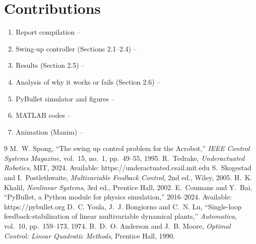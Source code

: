 \documentclass[12pt,a4paper]{article}
\begin{document}
\section{Contributions}
\begin{enumerate}
\item Report compilation -- \underline{\hspace{4cm}}
\item Swing-up controller (Sections 2.1--2.4) -- \underline{\hspace{4cm}}
\item Results (Section 2.5) -- \underline{\hspace{4cm}}
\item Analysis of why it works or fails (Section 2.6) -- \underline{\hspace{4cm}}
\item PyBullet simulator and figures -- \underline{\hspace{4cm}}
\item MATLAB codes -- \underline{\hspace{4cm}}
\item Animation (Manim) -- \underline{\hspace{4cm}}
\end{enumerate}

\begin{thebibliography}{9}
 M.~W. Spong, ``The swing up control problem for the Acrobot,'' \emph{IEEE Control Systems Magazine}, vol.~15, no.~1, pp.~49--55, 1995.
 R.~Tedrake, \emph{Underactuated Robotics}, MIT, 2024. Available: https://underactuated.csail.mit.edu
 S.~Skogestad and I.~Postlethwaite, \emph{Multivariable Feedback Control}, 2nd ed., Wiley, 2005.
 H.~K. Khalil, \emph{Nonlinear Systems}, 3rd ed., Prentice Hall, 2002.
 E.~Coumans and Y.~Bai, ``PyBullet, a Python module for physics simulation,'' 2016--2024. Available: https://pybullet.org
 D.~C. Youla, J.~J. Bongiorno and C.~N. Lu, ``Single-loop feedback-stabilization of linear multivariable dynamical plants,'' \emph{Automatica}, vol.~10, pp.~159--173, 1974.
 B.~D.~O. Anderson and J.~B. Moore, \emph{Optimal Control: Linear Quadratic Methods}, Prentice Hall, 1990.
\end{thebibliography}
\end{document}
